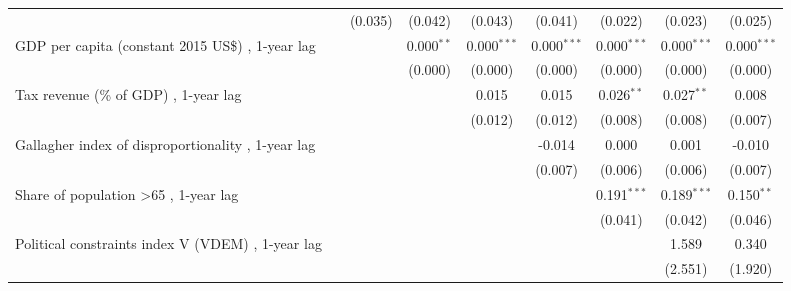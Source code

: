 \begin{table}[htbp]
\begin{tabular}{lcccccccc}
                                                                                    &                & (0.035)       & (0.042)       & (0.043)       & (0.041)       & (0.022)        & (0.023)        & (0.025)\\   
      GDP per capita (constant 2015 US\$) , 1-year lag                              &                &               & 0.000$^{**}$  & 0.000$^{***}$ & 0.000$^{***}$ & 0.000$^{***}$  & 0.000$^{***}$  & 0.000$^{***}$\\   
                                                                                    &                &               & (0.000)       & (0.000)       & (0.000)       & (0.000)        & (0.000)        & (0.000)\\   
      Tax revenue (\% of GDP) , 1-year lag                                          &                &               &               & 0.015         & 0.015         & 0.026$^{**}$   & 0.027$^{**}$   & 0.008\\   
                                                                                    &                &               &               & (0.012)       & (0.012)       & (0.008)        & (0.008)        & (0.007)\\   
      Gallagher index of disproportionality , 1-year lag                            &                &               &               &               & -0.014        & 0.000          & 0.001          & -0.010\\   
                                                                                    &                &               &               &               & (0.007)       & (0.006)        & (0.006)        & (0.007)\\   
      Share of population >65 , 1-year lag                                          &                &               &               &               &               & 0.191$^{***}$  & 0.189$^{***}$  & 0.150$^{**}$\\   
                                                                                    &                &               &               &               &               & (0.041)        & (0.042)        & (0.046)\\   
      Political constraints index V (VDEM) , 1-year lag                             &                &               &               &               &               &                & 1.589          & 0.340\\   
                                                                                    &                &               &               &               &               &                & (2.551)        & (1.920)\\   

\end{tabular}
\end{table}
